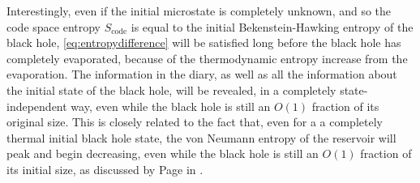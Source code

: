\documentclass[12pt]{article}
\begin{document}
Interestingly, even if the initial microstate is completely unknown, and so the code space entropy $S_\text{code}$ is equal to the initial Bekenstein-Hawking entropy of the black hole, \eqref{eq:entropydifference} will be satisfied long before the black hole has completely evaporated, because of the thermodynamic entropy increase from the evaporation. The information in the diary, as well as all the information about the initial state of the black hole, will be revealed, in a completely state-independent way, even while the black hole is still an $O(1)$ fraction of its original size. This is closely related to the fact that, even for a a completely thermal initial black hole state, the von Neumann entropy of the reservoir will peak and begin decreasing, even while the black hole is still an $O(1)$ fraction of its initial size, as discussed by Page in \cite{page2013time}.
\end{document}
